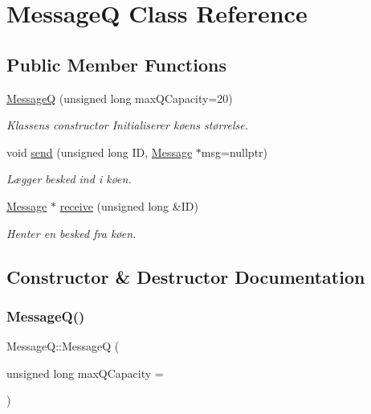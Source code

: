 \hypertarget{classMessageQ}{}\section{MessageQ Class Reference}
\label{classMessageQ}
\subsection*{Public Member Functions}
\begin{DoxyCompactItemize}
\item 
\hyperlink{classMessageQ_aab147ebcd0b13fb87c5767738636ae1b}{MessageQ} (unsigned long max\+Q\+Capacity=20)
\begin{DoxyCompactList}\small\item\em Klassens constructor Initialiserer køens størrelse. \end{DoxyCompactList}\item 
void \hyperlink{classMessageQ_a7914a62e73bbdefa25db31e7279dd7bb}{send} (unsigned long ID, \hyperlink{classMessage}{Message} $\ast$msg=nullptr)
\begin{DoxyCompactList}\small\item\em Lægger besked ind i køen. \end{DoxyCompactList}\item 
\hyperlink{classMessage}{Message} $\ast$ \hyperlink{classMessageQ_a188ce4eab91cfe6dc0362d97f2a82f6e}{receive} (unsigned long \&ID)
\begin{DoxyCompactList}\small\item\em Henter en besked fra køen. \end{DoxyCompactList}\end{DoxyCompactItemize}


\subsection{Constructor \& Destructor Documentation}
\mbox{\label{classMessageQ_aab147ebcd0b13fb87c5767738636ae1b}} 
\subsubsection{\texorpdfstring{Message\+Q()}{MessageQ()}}
{\footnotesize\ttfamily Message\+Q\+::\+MessageQ (\begin{DoxyParamCaption}\item[{unsigned long}]{max\+Q\+Capacity = {} }\end{DoxyParamCaption})\hspace{0.3cm}{\ttfamily [inline]}}



